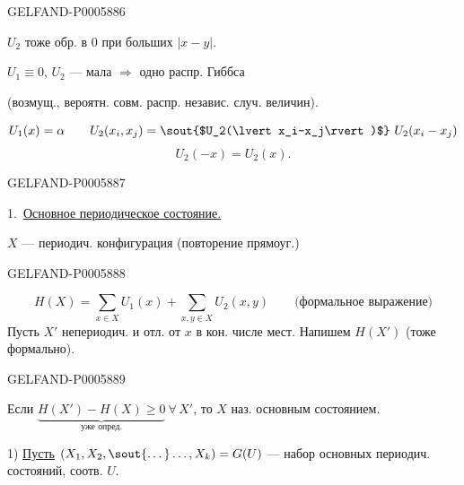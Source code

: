 \begin{GelfandAdjacentEvidence}{GELFAND-P000588}{6}

\(U_2\) тоже обр. в 0 при больших \(\lvert x-y\rvert\).

\(U_1\equiv0\), \(U_2\) — мала \(\Rightarrow\) одно распр. Гиббса

(возмущ., вероятн. совм. распр. независ. случ. величин).

\[
U_1(x)=\alpha\qquad
U_2(x_i,x_j)=\text{\sout{$U_2(\lvert x_i-x_j\rvert)$}}\ U_2(x_i-x_j)
\]
\[
U_2(-x)=U_2(x).
\]
\end{GelfandAdjacentEvidence}
\begin{GelfandAdjacentEvidence}{GELFAND-P000588}{7}


1.\ \underline{Основное периодическое состояние.}

\(X\) — периодич. конфигурация (повторение прямоуг.)
\end{GelfandAdjacentEvidence}
\begin{GelfandAdjacentEvidence}{GELFAND-P000588}{8}

\[
H(X)=\sum_{x\in X}U_1(x)+\sum_{x,y\in X}U_2(x,y)
\qquad\text{(формальное выражение)}
\]
Пусть \(X'\) непериодич. и отл. от \(x\) в кон. числе мест. Напишем \(H(X')\) (тоже формально).
\end{GelfandAdjacentEvidence}
\begin{GelfandAdjacentEvidence}{GELFAND-P000588}{9}


Если \(\underbrace{H(X')-H(X)\ge0}_{\text{уже опред.}}\ \forall\,X'\), то \(X\)
наз. основным состоянием.

1) \underline{Пусть}
\((X_1,X_2,\text{\sout{\textellipsis{}}}\ldots,X_k)=G(U)\)
— набор основных периодич. состояний, соотв. \(U\).
\end{GelfandAdjacentEvidence}



